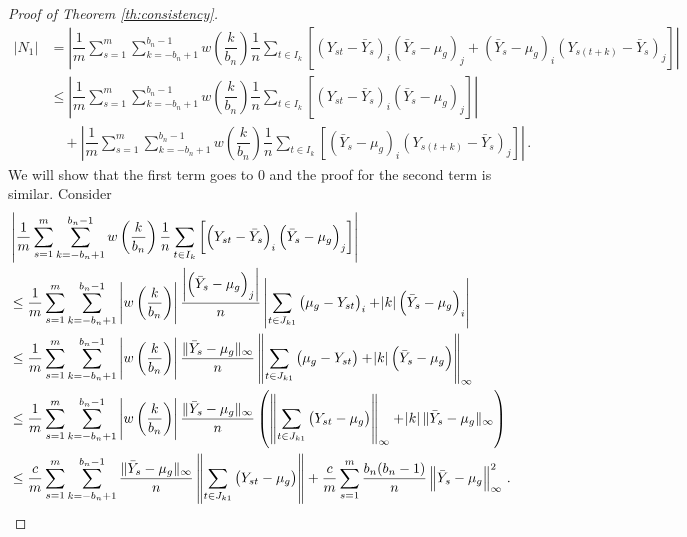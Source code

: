 \documentclass[11pt]{article}
\theoremstyle{remark}
\begin{document}
\begin{proof}[Proof of Theorem \ref{th:consistency}]
%
\begin{align*}
|N_1| & = \left|\dfrac{1}{m}\sum_{s=1}^{m}  \sum_{k=-b_n+1}^{b_n-1}  w\left(\dfrac{k}{b_n}\right)\dfrac{1}{n}  \sum_{t \in I_k}  \left[ \left(Y_{st} - \bar{Y}_s \right)_i  \left(\bar{Y}_s - \mu_g \right)_j + \left(\bar{Y}_s - \mu_g \right)_i  \left(Y_{s(t+k)} - \bar{Y}_s \right)_j\right] \right|\\
& \leq \left| \dfrac{1}{m}\sum_{s=1}^{m}\sum_{k=-b_n+1}^{b_n-1}w\left(\dfrac{k}{b_n}\right)\dfrac{1}{n}\sum_{t \in I_k}\left[ \left(Y_{st} - \bar{Y}_s \right)_i  \left(\bar{Y}_s - \mu_g \right)_j \right] \right| \\ 
& \quad + \left| \dfrac{1}{m}\sum_{s=1}^{m}\sum_{k=-b_n+1}^{b_n-1}w\left(\dfrac{k}{b_n}\right)\dfrac{1}{n}\sum_{t \in I_k}\left[ \left(\bar{Y}_s - \mu_g \right)_i  \left(Y_{s(t+k)} - \bar{Y}_s \right)_j\right] \right|\,.
\end{align*}
%
We will show that the first term goes to 0 and the proof for the second term is similar. Consider
\begin{align*}
    & \left| \dfrac{1}{m}\sum_{s=1}^{m}\sum_{k=-b_n+1}^{b_n-1}w\left(\dfrac{k}{b_n}\right)\dfrac{1}{n}\sum_{t \in I_k}\left[ \left(Y_{st} - \bar{Y}_s \right)_i  \left(\bar{Y}_s - \mu_g \right)_j \right] \right| \\
    & \leq \dfrac{1}{m}\sum_{s=1}^{m}\sum_{k=-b_n+1}^{b_n-1} \left| w\left(\dfrac{k}{b_n}\right) \right| \dfrac{ \left| \left(\bar{Y}_s - \mu_g \right)_j \right| }{n} \left| \sum_{t \in J_{k1}} \left(\mu_g - Y_{st} \right)_i  + \abs{k} \left(\bar{Y}_s - \mu_g \right)_i \right|\\
    & \leq \dfrac{1}{m}\sum_{s=1}^{m}\sum_{k=-b_n+1}^{b_n-1}  \left|w\left(\dfrac{k}{b_n}\right) \right|\dfrac{\|\bar{Y}_s - \mu_g\|_{\infty}}{n} \left\|\sum_{t \in J_{k1}} \left(\mu_g - Y_{st} \right) + \abs{k} \left(\bar{Y}_s - \mu_g \right)\right\|_{\infty}\\
    & \leq \dfrac{1}{m}\sum_{s=1}^{m}\sum_{k=-b_n+1}^{b_n-1} \left|w\left(\dfrac{k}{b_n}\right) \right|\dfrac{\|\bar{Y}_s - \mu_g\|_{\infty}}{n} \left(\left\|\sum_{t \in J_{k1}}  \left(Y_{st} - \mu_g \right)\right\|_{\infty} + \abs{k}\|\bar{Y}_s - \mu_g\|_{\infty} \right)\\
    & \leq \dfrac{c}{m}\sum_{s=1}^{m}\sum_{k=-b_n+1}^{b_n-1}\dfrac{\|\bar{Y}_s - \mu_g\|_{\infty}}{n} \left\|\sum_{t \in J_{k1}} \left(Y_{st} - \mu_g\right) \right\| + \dfrac{c}{m}\sum\limits_{s=1}^{m} \dfrac{b_n(b_n-1)}{n} \left \|\bar{Y}_s - \mu_g \right \|_{\infty}^2\,.
\end{align*}


\end{proof}
\end{document}
